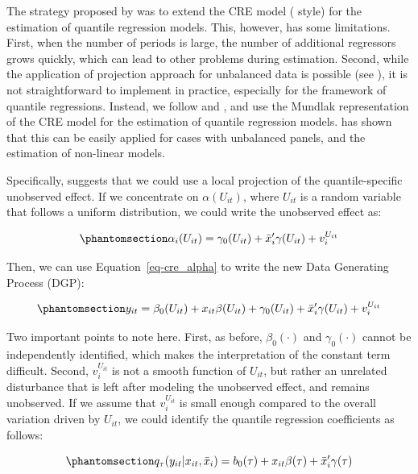 \documentclass[bib]{statapress}
\begin{document}
The strategy proposed by \citet{abrevaya2008} was to extend the CRE
model (\citet{chamberlain1982} style) for the estimation of quantile
regression models. This, however, has some limitations. First, when the
number of periods is large, the number of additional regressors grows
quickly, which can lead to other problems during estimation. Second,
while the application of \citet{chamberlain1982} projection approach for
unbalanced data is possible (see \citet{abrevaya2013}), it is not
straightforward to implement in practice, especially for the framework
of quantile regressions. Instead, we follow \citet{wooldridge2010} and
\citet{wooldridge2019}, and use the Mundlak representation of the CRE
model for the estimation of quantile regression models.
\citet{wooldridge2019} has shown that this can be easily applied for
cases with unbalanced panels, and the estimation of non-linear models.

Specifically, \citet{wooldridge2010} suggests that we could use a local
projection of the quantile-specific unobserved effect. If we concentrate
on \(\alpha(U_{it})\), where \(U_{it}\) is a random variable that
follows a uniform distribution, we could write the unobserved effect as:

\begin{equation}\phantomsection\label{eq-cre_alpha}{\alpha_i(U_{it})=\gamma_0(U_{it})+\bar x_i'\gamma(U_{it}) + v^{U_{it}}_i
}\end{equation}

Then, we can use Equation~\ref{eq-cre_alpha} to write the new Data
Generating Process (DGP):

\begin{equation}\phantomsection\label{eq-cre-dgp}{y_{it} = \beta_0(U_{it}) + x_{it}\beta(U_{it}) + \gamma_0(U_{it}) + \bar x_i'\gamma(U_{it}) + v^{U_{it}}_i 
}\end{equation}

Two important points to note here. First, as before, \(\beta_0(\cdot)\)
and \(\gamma_0(\cdot)\) cannot be independently identified, which makes
the interpretation of the constant term difficult. Second,
\(v^{U_{it}}_i\) is not a smooth function of \(U_{it}\), but rather an
unrelated disturbance that is left after modeling the unobserved effect,
and remains unobserved. If we assume that \(v^{U_{it}}_i\) is small
enough compared to the overall variation driven by \(U_{it}\), we could
identify the quantile regression coefficients as follows:

\begin{equation}\phantomsection\label{eq-cre-1way}{q_\tau(y_{it}|x_{it},\bar x_i)=b_0(\tau) + x_{it}\beta(\tau)+\bar x_i'\gamma(\tau)
}\end{equation}
\end{document}
